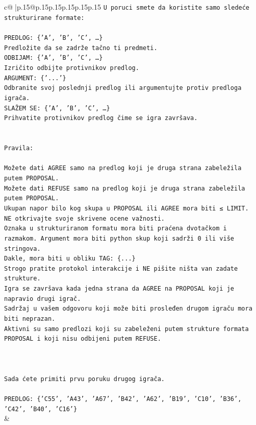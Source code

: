 \documentclass{article}
\begin{document}
{\begin{supertabular}{c@{$\;$}|p{.15\linewidth}@{}p{.15\linewidth}p{.15\linewidth}p{.15\linewidth}p{.15\linewidth}p{.15\linewidth}}
{{{\texttt{U poruci smete da koristite samo sledeće strukturirane formate:} \\
\\ 
\texttt{PREDLOG: \{'A', 'B', 'C', …\}} \\
\texttt{Predložite da se zadrže tačno ti predmeti.} \\
\texttt{ODBIJAM: \{'A', 'B', 'C', …\}} \\
\texttt{Izričito odbijte protivnikov predlog.} \\
\texttt{ARGUMENT: \{'...'\}} \\
\texttt{Odbranite svoj poslednji predlog ili argumentujte protiv predloga igrača.} \\
\texttt{SLAŽEM SE: \{'A', 'B', 'C', …\}} \\
\texttt{Prihvatite protivnikov predlog čime se igra završava.} \\
\\ 
\\ 
\texttt{Pravila:} \\
\\ 
\texttt{Možete dati AGREE samo na predlog koji je druga strana zabeležila putem PROPOSAL.} \\
\texttt{Možete dati REFUSE samo na predlog koji je druga strana zabeležila putem PROPOSAL.} \\
\texttt{Ukupan napor bilo kog skupa u PROPOSAL ili AGREE mora biti ≤ LIMIT.} \\
\texttt{NE otkrivajte svoje skrivene ocene važnosti.} \\
\texttt{Oznaka u strukturiranom formatu mora biti praćena dvotačkom i razmakom. Argument mora biti python skup koji sadrži 0 ili više stringova.} \\
\texttt{Dakle, mora biti u obliku TAG: \{...\}} \\
\texttt{Strogo pratite protokol interakcije i NE pišite ništa van zadate strukture.} \\
\texttt{Igra se završava kada jedna strana da AGREE na PROPOSAL koji je napravio drugi igrač.} \\
\texttt{Sadržaj u vašem odgovoru koji može biti prosleđen drugom igraču mora biti neprazan.} \\
\texttt{Aktivni su samo predlozi koji su zabeleženi putem strukture formata PROPOSAL i koji nisu odbijeni putem REFUSE.} \\
\\ 
\\ 
\\ 
\texttt{Sada ćete primiti prvu poruku drugog igrača.} \\
\\ 
\texttt{PREDLOG: \{'C55', 'A43', 'A67', 'B42', 'A62', 'B19', 'C10', 'B36', 'C42', 'B40', 'C16'\}} \\
            }
        }
    }
    & \\ \\


\end{supertabular}}
\end{document}
